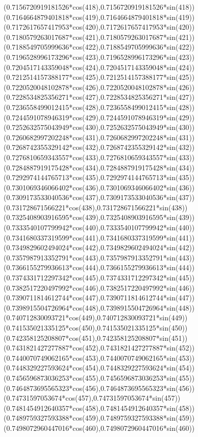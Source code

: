 {({0.7156720919181526*cos(418)},{0.7156720919181526*sin(418)})
({0.7164664879401818*cos(419)},{0.7164664879401818*sin(419)})
({0.7172617657417953*cos(420)},{0.7172617657417953*sin(420)})
({0.7180579263017687*cos(421)},{0.7180579263017687*sin(421)})
({0.7188549705999636*cos(422)},{0.7188549705999636*sin(422)})
({0.7196528996173296*cos(423)},{0.7196528996173296*sin(423)})
({0.7204517143359048*cos(424)},{0.7204517143359048*sin(424)})
({0.7212514157388177*cos(425)},{0.7212514157388177*sin(425)})
({0.7220520048102878*cos(426)},{0.7220520048102878*sin(426)})
({0.7228534825356271*cos(427)},{0.7228534825356271*sin(427)})
({0.7236558499012415*cos(428)},{0.7236558499012415*sin(428)})
({0.7244591078946319*cos(429)},{0.7244591078946319*sin(429)})
({0.7252632575043949*cos(430)},{0.7252632575043949*sin(430)})
({0.7260682997202248*cos(431)},{0.7260682997202248*sin(431)})
({0.7268742355329142*cos(432)},{0.7268742355329142*sin(432)})
({0.7276810659343557*cos(433)},{0.7276810659343557*sin(433)})
({0.7284887919175428*cos(434)},{0.7284887919175428*sin(434)})
({0.7292974144765713*cos(435)},{0.7292974144765713*sin(435)})
({0.7301069346066402*cos(436)},{0.7301069346066402*sin(436)})
({0.7309173533040536*cos(437)},{0.7309173533040536*sin(437)})
({0.731728671566221*cos(438)},{0.731728671566221*sin(438)})
({0.7325408903916595*cos(439)},{0.7325408903916595*sin(439)})
({0.7333540107799942*cos(440)},{0.7333540107799942*sin(440)})
({0.7341680337319599*cos(441)},{0.7341680337319599*sin(441)})
({0.7349829602494024*cos(442)},{0.7349829602494024*sin(442)})
({0.7357987913352791*cos(443)},{0.7357987913352791*sin(443)})
({0.7366155279936613*cos(444)},{0.7366155279936613*sin(444)})
({0.7374331712297342*cos(445)},{0.7374331712297342*sin(445)})
({0.7382517220497992*cos(446)},{0.7382517220497992*sin(446)})
({0.7390711814612744*cos(447)},{0.7390711814612744*sin(447)})
({0.7398915504726964*cos(448)},{0.7398915504726964*sin(448)})
({0.740712830093721*cos(449)},{0.740712830093721*sin(449)})
({0.741535021335125*cos(450)},{0.741535021335125*sin(450)})
({0.742358125208807*cos(451)},{0.742358125208807*sin(451)})
({0.7431821427277887*cos(452)},{0.7431821427277887*sin(452)})
({0.7440070749062165*cos(453)},{0.7440070749062165*sin(453)})
({0.7448329227593624*cos(454)},{0.7448329227593624*sin(454)})
({0.7456596873036253*cos(455)},{0.7456596873036253*sin(455)})
({0.7464873695565323*cos(456)},{0.7464873695565323*sin(456)})
({0.74731597053674*cos(457)},{0.74731597053674*sin(457)})
({0.7481454912640357*cos(458)},{0.7481454912640357*sin(458)})
({0.7489759327593388*cos(459)},{0.7489759327593388*sin(459)})
({0.7498072960447016*cos(460)},{0.7498072960447016*sin(460)})
}
